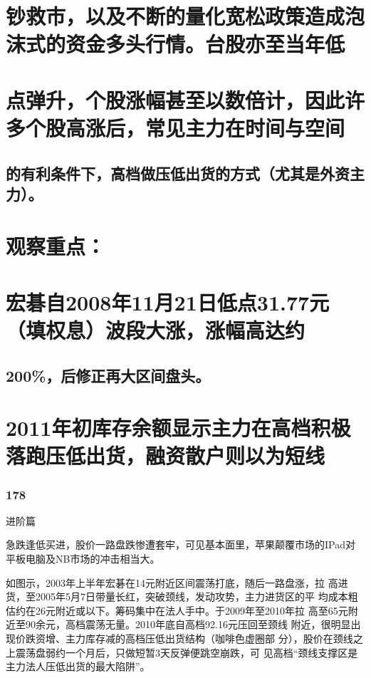 \documentclass{article}
\begin{document}
\section{钞救市，以及不断的量化宽松政策造成泡沫式的资金多头行情。台股亦至当年低}

\section{点弹升，个股涨幅甚至以数倍计，因此许多个股高涨后，常见主力在时间与空间}

\subsection{的有利条件下，高档做压低出货的方式（尤其是外资主力）。}

\section{观察重点：}

\section{宏碁自2008年11月21日低点31.77元（填权息）波段大涨，涨幅高达约}

\subsection{200\%，后修正再大区间盘头。}

\section{2011年初库存余额显示主力在高档积极落跑压低出货，融资散户则以为短线}

\subsubsection{178}

\clearpage

进阶篇

急跌逢低买进，股价一路盘跌惨遭套牢，可见基本面里，苹果颠覆市场的IPad对 平板电脑及NB市场的冲击相当大。

如图示，2003年上半年宏碁在14元附近区间震荡打底，随后一路盘涨，拉 高进货，至2005年5月7日带量长红，突破颈线，发动攻势，主力进货区的平 均成本粗估约在26元附近或以下。筹码集中在法人手中。于2009年至2010年拉 高至65元附近至90余元，高档震荡无量。2010年底自高档92.16元压回至颈线 附近，很明显出现价跌资增、主力库存减的高档压低出货结构（咖啡色虚圈部 分），股价在颈线之上震荡盘弱约一个月后，只做短暂3天反弹便跳空崩跌，可 见高档“颈线支撑区是主力法人压低出货的最大陷阱”。
\end{document}
